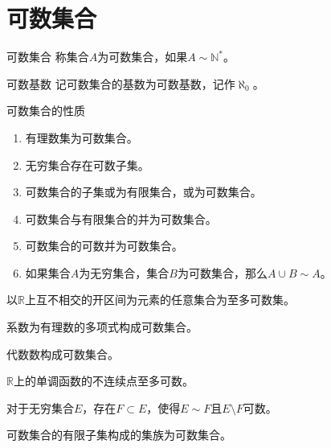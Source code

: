 \documentclass[lang = cn, scheme = chinese, thmcnt = section]{elegantbook}
\newcommand{\N}{\mathbb{N}}            %
\newcommand{\R}{\mathbb{R}}            %
\newcommand{\sub}{\subset}             %
\begin{document}
\section{可数集合}

\begin{definition}{可数集合}
	称集合$A$为可数集合，如果$A\sim \N^*$。
\end{definition}

\begin{definition}{可数基数}
	记可数集合的基数为可数基数，记作$\aleph_0$。
\end{definition}

\begin{theorem}{可数集合的性质}
	\begin{enumerate}
		\item 有理数集为可数集合。
		\item 无穷集合存在可数子集。
		\item 可数集合的子集或为有限集合，或为可数集合。
		\item 可数集合与有限集合的并为可数集合。
		\item 可数集合的可数并为可数集合。
		\item 如果集合$A$为无穷集合，集合$B$为可数集合，那么$A\cup B\sim A$。
	\end{enumerate}
\end{theorem}

\begin{exercise}
	以$\R$上互不相交的开区间为元素的任意集合为至多可数集。
\end{exercise}

\begin{exercise}
	系数为有理数的多项式构成可数集合。
\end{exercise}

\begin{exercise}
	代数数构成可数集合。
\end{exercise}

\begin{exercise}
	$\R$上的单调函数的不连续点至多可数。
\end{exercise}

\begin{exercise}
	对于无穷集合$E$，存在$F\sub E$，使得$E\sim F$且$E\setminus F$可数。
\end{exercise}

\begin{exercise}
	可数集合的有限子集构成的集族为可数集合。
\end{exercise}
\end{document}
